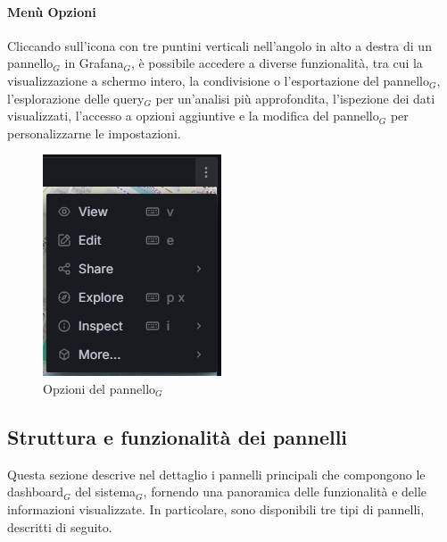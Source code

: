 \documentclass[10pt]{article}
\begin{document}
\begin{justify}
    \paragraph{Menù Opzioni}
    Cliccando sull'icona con tre puntini verticali nell'angolo in alto a destra di un pannello$_G$ in Grafana$_G$, è possibile accedere a diverse funzionalità, tra cui la visualizzazione a schermo intero, la condivisione o l'esportazione del pannello$_G$, l'esplorazione delle query$_G$ per un'analisi più approfondita, l'ispezione dei dati visualizzati, l'accesso a opzioni aggiuntive e la modifica del pannello$_G$ per personalizzarne le impostazioni.
    \begin{figure}[H]
    \centering
    \includegraphics[width=0.25\linewidth]{opzioni.png}
    \caption{Opzioni del pannello$_G$}
    \end{figure}

\subsection{Struttura e funzionalità dei pannelli}
Questa sezione descrive nel dettaglio i pannelli principali che compongono le dashboard$_G$ del sistema$_G$, fornendo una panoramica delle funzionalità e delle informazioni visualizzate. In particolare, sono disponibili tre tipi di pannelli, descritti di seguito.


\end{justify}
\end{document}
